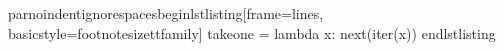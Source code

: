 \markdownRendererDocumentBegin
\markdownRendererBackslash{}par\markdownRendererBackslash{}noindent\markdownRendererBackslash{}ignorespaces\markdownRendererBackslash{}begin\markdownRendererLeftBrace{}lstlisting\markdownRendererRightBrace{}[frame=lines, basicstyle=\markdownRendererBackslash{}footnotesize\markdownRendererBackslash{}ttfamily] take\markdownRendererUnderscore{}one = lambda x: next(iter(x)) \markdownRendererBackslash{}end\markdownRendererLeftBrace{}lstlisting\markdownRendererRightBrace{}\markdownRendererDocumentEnd